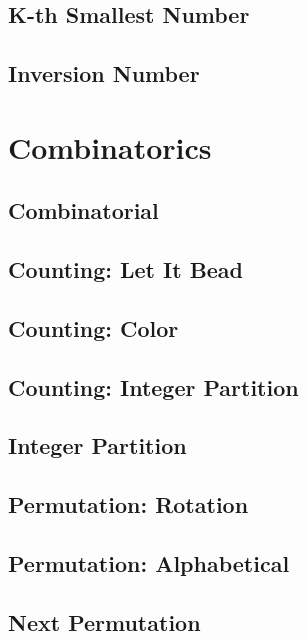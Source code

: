 \documentclass{article}
\begin{document}
    \subsection{K-th Smallest Number}
        
    \subsection{Inversion Number}
        

\section{Combinatorics}
    \subsection{Combinatorial}
        
    \subsection{Counting: Let It Bead}
        
    \subsection{Counting: Color}
        
    \subsection{Counting: Integer Partition}
        
    \subsection{Integer Partition}
        
    \subsection{Permutation: Rotation}

    \subsection{Permutation: Alphabetical}
        
    \subsection{Next Permutation}
        
\end{document}
